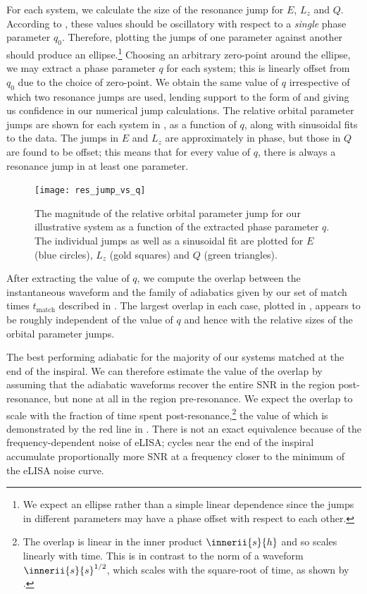 For each system, we calculate the size of the resonance jump for $E$, $L_z$ and $Q$. According to , these values should be oscillatory with respect to a \emph{single} phase parameter $q_0$. Therefore, plotting the jumps of one parameter against another should produce an ellipse.\footnote{We expect an ellipse rather than a simple linear dependence since the jumps in different parameters may have a phase offset with respect to each other.} Choosing an arbitrary zero-point around the ellipse, we may extract a phase parameter $q$ for each system; this is linearly offset from $q_0$ due to the choice of zero-point. We obtain the same value of $q$ irrespective of which two resonance jumps are used, lending support to the form of  and giving us confidence in our numerical jump calculations. The relative orbital parameter jumps are shown for each system in , as a function of $q$, along with sinusoidal fits to the data. The jumps in $E$ and $L_z$ are approximately in phase, but those in $Q$ are found to be offset; this means that for every value of $q$, there is always a resonance jump in at least one parameter.

\begin{figure}[htbp]
\centering
\texttt{[image: res\_jump\_vs\_q]}
\caption{\label{fig:res-jump-vs-q}The magnitude of the relative orbital parameter jump for our illustrative system as a function of the extracted phase parameter $q$. The individual jumps as well as a sinusoidal fit are plotted for $E$ (blue circles), $L_z$ (gold squares) and $Q$ (green triangles).}
\end{figure}

After extracting the value of $q$, we compute the overlap between the instantaneous waveform and the family of adiabatics given by our set of match times $t_\mathrm{match}$ described in . The largest overlap in each case, plotted in , appears to be roughly independent of the value of $q$ and hence with the relative sizes of the orbital parameter jumps.

The best performing adiabatic for the majority of our systems matched at the end of the inspiral. We can therefore estimate the value of the overlap by assuming that the adiabatic waveforms recover the entire SNR in the region post-resonance, but none at all in the region pre-resonance. We expect the overlap to scale with the fraction of time spent post-resonance,\footnote{The overlap is linear in the inner product $\innerii{s}{h}$ and so scales linearly with time. This is in contrast to the norm of a waveform $\innerii{s}{s}^{1/2}$, which scales with the square-root of time, as shown by .} the value of which is demonstrated by the red line in . There is not an exact equivalence because of the frequency-dependent noise of eLISA; cycles near the end of the inspiral accumulate proportionally more SNR at a frequency closer to the minimum of the eLISA noise curve.

